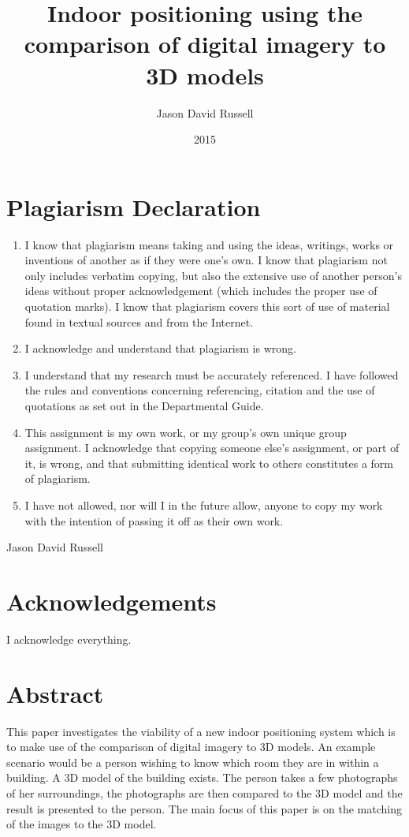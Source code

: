 \documentclass[11pt,a4paper]{article}
\title{Indoor positioning using the comparison of digital imagery to 3D models}
\date{2015}
\author{Jason David Russell}
\begin{document}
\maketitle
\thispagestyle{empty}

\setcounter{page}{0}

\newpage
\section*{Plagiarism Declaration}
	\begin{enumerate}
		\item
			I know that plagiarism means taking and using the ideas, writings, works or inventions of another as if they were one's own. I know that plagiarism not only includes verbatim copying, but also the extensive use of another person's ideas without proper acknowledgement (which includes the proper use of quotation marks). I know that plagiarism covers this sort of use of material found in textual sources and from the Internet.
		\item
			I acknowledge and understand that plagiarism is wrong.
		\item
			I understand that my research must be accurately referenced. I have followed the rules and conventions concerning referencing, citation and the use of quotations as set out in the Departmental Guide.
		\item
			This assignment is my own work, or my group's own unique group assignment.
			I acknowledge that copying someone else's assignment, or part of it, is wrong, and that submitting identical work to others constitutes a form of plagiarism.
		\item
			I have not allowed, nor will I in the future allow, anyone to copy my work with the intention of passing it off as their own work.
	\end{enumerate}
	Jason David Russell

\newpage
\section*{Acknowledgements}
	I acknowledge everything.

\newpage
\section*{Abstract}
	This paper investigates the viability of a new indoor positioning system which is to make use of the comparison of digital imagery to 3D models. An example scenario would be a person wishing to know which room they are in within a building. A 3D model of the building exists. The person takes a few photographs of her surroundings, the photographs are then compared to the 3D model and the result is presented to the person. The main focus of this paper is on the matching of the images to the 3D model.
\end{document}
